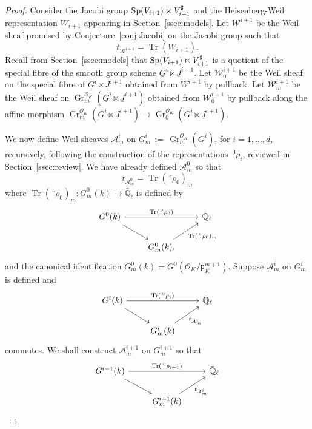 \documentclass[10pt]{amsart}
\theoremstyle{plain}
\theoremstyle{definition}
\newcommand{\EE}{\mathbb{\bar Q}_\ell}
\newcommand{\OK}{\mathcal{O}_K}
\newcommand{\Fq}{k}
\DeclareMathOperator{\Gr}{Gr}
\DeclareMathOperator{\trace}{Tr}
\newcommand{\ceq}{{\, :=\, }}
\newcommand{\trFrob}[1]{t_{#1}}
\newcommand{\cs}[1]{{\mathcal{#1}}}
\begin{document}
\begin{proof}
Consider the Jacobi group ${\operatorname{Sp}}(V_{i+1})\ltimes V_{i+1}^\sharp$ and the Heisenberg-Weil representation $W_{i+1}$ appearing in Section~\ref{ssec:models}.
Let $\cs{W}^{i+1}$ be the Weil sheaf promised by Conjecture~\ref{conj:Jacobi} on the Jacobi group such that
\[
\trFrob{\cs{W}^{i+1}} = \trace(W_{i+1}).
\]
Recall from Section~\ref{ssec:models} that ${\operatorname{Sp}}(V_{i+1})\ltimes V_{i+1}^\sharp$ is a quotient of the special fibre of the smooth group scheme $\underline{G}^{i} \ltimes \underline{J}^{i+1}$.
Let $\cs{W}_0^{i+1}$ be the Weil sheaf on the special fibre of $\underline{G}^{i} \ltimes \underline{J}^{i+1}$ obtained from $W^{i+1}$ by pullback. 
Let $\cs{W}_m^{i+1}$ be the Weil sheaf on $\Gr^{\OK}_m(\underline{G}^{i} \ltimes \underline{J}^{i+1})$ obtained from $\cs{W}_0^{i+1}$ by pullback along the affine morphism
$\Gr^{\OK}_m(\underline{G}^{i} \ltimes \underline{J}^{i+1}) \to \Gr^{\OK}_0(\underline{G}^{i} \ltimes \underline{J}^{i+1})$.

We now define Weil sheaves $\cs{A}^i_m$ on $G_m^i \ceq \Gr^{\OK}_m(\underline{G}^{i})$, for $i=1,\ldots ,d$, recursively, following the construction of the representations $\,^0\rho_i$, reviewed in Section~\ref{ssec:review}.
We have already defined $\cs{A}^0_m$ so that 
\[
\trFrob{\cs{A}^0_m} = \trace(\,^\circ \rho_0)_m
\]
where $\trace(\,^\circ \rho_0)_m : G_m^0(\Fq) \to \EE$ is defined by 
\[
\begin{tikzcd}
G^0(\Fq) \arrow{rr}{\trace(\,^\circ \rho_0)} \arrow{rd} && \EE\\
& G^0_m(\Fq). \arrow{ru}[swap]{\trace(\,^\circ \rho_0)_m} & 
\end{tikzcd}
\]
and the canonical identification $G_m^0(\Fq) = \underline{G}^0(\OK/\mathfrak{p}_K^{m+1})$.
Suppose $\cs{A}^i_m$ on $G_m^i$ is defined and \[
\begin{tikzcd}
G^i(\Fq) \arrow{rr}{\trace(\,^\circ \rho_i)} \arrow{rd} && \EE\\
& G_m^i(\Fq) \arrow{ru}[swap]{\trFrob{\cs{A}_m^i}} & 
\end{tikzcd}
\]
commutes.
We shall construct $\cs{A}_m^{i+1}$ on $G_m^{i+1}$ so that 
\[
\begin{tikzcd}
G^{i+1}(\Fq) \arrow{rr}{\trace(\,^\circ \rho_{i+1})} \arrow{rd} && \EE\\
& G_m^{i+1}(\Fq)\arrow{ru}[swap]{{\trFrob{\cs{A}_m^i}} } & 
\end{tikzcd}
\]


\end{proof}
\end{document}
